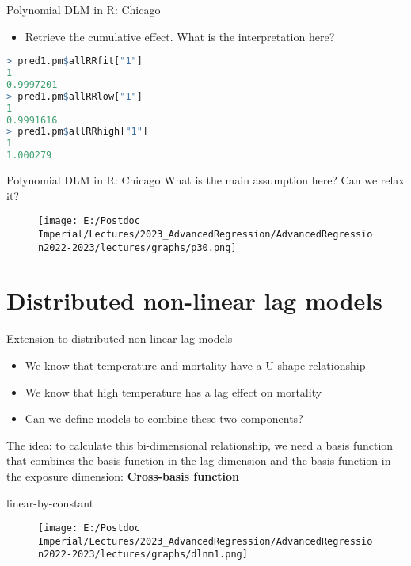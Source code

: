 \documentclass{beamer}
\begin{document}
\begin{frame}[fragile]{Polynomial DLM in R: Chicago}
	\begin{itemize}
		\item Retrieve the cumulative effect. What is the interpretation here?
	\end{itemize}
	\begin{lstlisting}[language=R, basicstyle=\tiny]
> pred1.pm$allRRfit["1"]
1 
0.9997201 
> pred1.pm$allRRlow["1"]
1 
0.9991616 
> pred1.pm$allRRhigh["1"]
1 
1.000279 
	\end{lstlisting}
\end{frame}


\begin{frame}[fragile]{Polynomial DLM in R: Chicago}
What is the main assumption here? Can we relax it?
	\begin{figure}
	\centering	
	\texttt{[image: E:/Postdoc Imperial/Lectures/2023\_AdvancedRegression/AdvancedRegression2022-2023/lectures/graphs/p30.png]}	
\end{figure}
\end{frame}

\section{Distributed non-linear lag models}

\begin{frame}[fragile]{Extension to distributed non-linear lag models}
	\begin{itemize}
		\item We know that temperature and mortality have a U-shape relationship
		\item We know that high temperature has a lag effect on mortality
		\item Can we define models to combine these two components?
	\end{itemize}

The idea: to calculate this bi-dimensional relationship, we need a basis function that combines the basis function in the lag dimension and the basis function in the exposure dimension: \textbf{Cross-basis function}
	
\end{frame}


\begin{frame}[fragile]{linear-by-constant}
	\begin{figure}
	\centering	
	\texttt{[image: E:/Postdoc Imperial/Lectures/2023\_AdvancedRegression/AdvancedRegression2022-2023/lectures/graphs/dlnm1.png]}	
\end{figure}
\end{frame}
\end{document}

